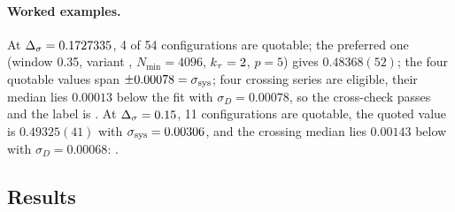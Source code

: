 \paragraph{Worked examples.} At $\Delta_\sigma=0.1727335$, 4 of 54 configurations are quotable; the preferred one (window 0.35, variant ,
$N_{\min}=4096$, $k_\tau=2$, $p=5$) gives $0.48368(52)$; the four quotable values span $\pm0.00078=\sigma_{\rm sys}$; four crossing series are eligible,
their median lies $0.00013$ below the fit with $\sigma_D=0.00078$, so the cross-check passes and the label is . At $\Delta_\sigma=0.15$,
11 configurations are quotable, the quoted value is $0.49325(41)$ with $\sigma_{\rm sys}=0.00306$, and the crossing median lies $0.00143$ below with
$\sigma_D=0.00068$: .

\subsection{Results}
